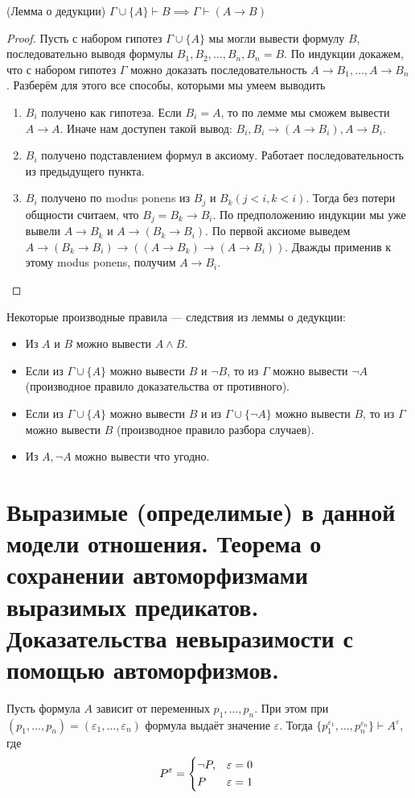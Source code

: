 \documentclass{article}
\begin{document}
\begin{theorem}{(Лемма о дедукции)}
	$\Gamma \cup \{A\} \vdash B \implies \Gamma \vdash (A \to B)$
\end{theorem}

\begin{proof}
	Пусть с набором гипотез $\Gamma \cup \{A\}$ мы могли вывести формулу $B$, последовательно выводя формулы $B_1, B_2, \ldots, B_n, B_n = B$. По индукции докажем, что с набором гипотез $\Gamma$ можно доказать последовательность $A \to B_1, \ldots, A \to B_n$. Разберём для этого все способы, которыми мы умеем выводить
	\begin{enumerate}
	\item $B_i$ получено как гипотеза. Если $B_i = A$, то по лемме мы сможем вывести $A \to A$. Иначе нам доступен такой вывод: $B_i, B_i \to (A \to B_i), A \to B_i$.
	\item $B_i$ получено подставлением формул в аксиому. Работает последовательность из предыдущего пункта.
	\item $B_i$ получено по modus ponens из $B_j$ и $B_k(j < i , k < i)$. Тогда без потери общности считаем, что $B_j = B_k \to B_i$. По предположению индукции мы уже вывели $A \to B_k$ и $A \to (B_k \to B_i)$. По первой аксиоме выведем $A \to (B_k \to B_i) \to ((A \to B_k) \to (A \to B_i))$. Дважды применив к этому modus ponens, получим $A \to B_i$.
	\end{enumerate}
\end{proof}
Некоторые производные правила --- следствия из леммы о дедукции:
\begin{itemize}
	\item Из $A$ и $B$ можно вывести $A \land B$.
	\item Если из $\Gamma \cup \{A\}$ можно вывести $B$ и $\lnot B$, то из $\Gamma$ можно вывести $\lnot A$ (производное правило доказательства от противного).
	\item Если из $\Gamma \cup \{A\}$ можно вывести $B$ и из $\Gamma \cup \{\lnot A\}$ можно вывести $B$, то из $\Gamma$ можно вывести $B$ (производное правило разбора случаев).
	\item Из $A, \lnot A$ можно вывести что угодно.
\end{itemize}

\section{Выразимые (определимые) в данной модели отношения. Теорема о сохранении автоморфизмами выразимых предикатов. Доказательства невыразимости с помощью автоморфизмов.}
\begin{lemma}
	Пусть формула $A$ зависит от переменных $p_1, \ldots, p_n$. При этом при $(p_1, \ldots, p_n) = (\varepsilon_1, \ldots, \varepsilon_n)$ формула выдаёт значение $\varepsilon$. Тогда $\{p_1^{\varepsilon_1}, \ldots, p_n^{\varepsilon_n}\} \vdash A^{\varepsilon}$, где
\[P^\varepsilon = \begin{dcases*} \lnot P, & $\varepsilon = 0$ \\ P& $\varepsilon = 1$ \end{dcases*} \]
\end{lemma}
\end{document}
